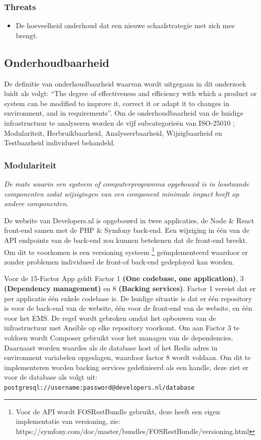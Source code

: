 \subsubsection{Threats}
\begin{itemize}
	\item De hoeveelheid onderhoud dat een nieuwe schaalstrategie met zich mee brengt.
\end{itemize}


\subsection{Onderhoudbaarheid}
De definitie van onderhoudbaarheid waarvan wordt uitgegaan in dit onderzoek luidt als volgt: \enquote{The degree of effectiveness and efficiency with which a product or system can be modified to improve it, correct it or adapt it to changes in environment, and in requirements}. Om de onderhoudbaarheid van de huidige infrastructuur te analyseren worden de vijf subcategorieën van ISO-25010 \parencite{ISO25010}; Modulariteit, Herbruikbaarheid, Analyseerbaarheid, Wijzigbaarheid en Testbaarheid individueel behandeld.

\subsubsection{Modulariteit} %
\textit{De mate waarin een systeem of computerprogramma opgebouwd is in losstaande componenten zodat wijzigingen van een component minimale impact heeft op andere componenten.}

De website van Developers.nl is opgebouwd in twee applicaties, de Node \& React front-end samen met de PHP \& Symfony back-end. Een wijziging in één van de API endpoints van de back-end zou kunnen betekenen dat de front-end breekt. Om dit te voorkomen is een versioning systeem \footnote{Voor de API wordt FOSRestBundle gebruikt, deze heeft een eigen implementatie van versioning, zie: https://symfony.com/doc/master/bundles/FOSRestBundle/versioning.html} geïmplementeerd waardoor er zonder problemen individueel de front-of back-end gedeployed kan worden.

Voor de 15-Factor App geldt Factor 1 \textbf{(One codebase, one application)}, 3 \textbf{(Dependency management)} en 8 \textbf{(Backing services)}. Factor 1 vereist dat er per applicatie één enkele codebase is. De huidige situatie is dat er één repository is voor de back-end van de website, één voor de front-end van de website, en één voor het EMS. De regel wordt gebroken omdat het opbouwen van de infrastructuur met Ansible op elke repository voorkomt. Om aan Factor 3 te voldoen wordt Composer gebruikt voor het managen van de dependencies. Daarnaast worden waardes als de database host of het Redis adres in environment variabelen opgeslagen, waardoor factor 8 wordt voldaan. Om dit te implementeren worden backing services gedefinieerd als een handle, deze ziet er voor de database als volgt uit:\\ \texttt{postgresql://username:password@developers.nl/database}

